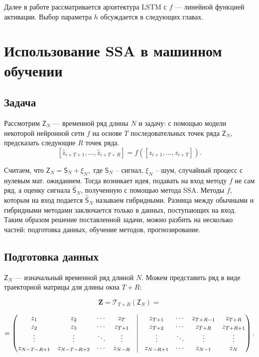\documentclass[specialist,
               substylefile = spbu.rtx,
               subf,href,colorlinks=true, 12p]{disser}
\begin{document}
Далее в работе рассматривается архитектура LSTM с $f$ --- линейной функцией активации. Выбор параметра $h$ обсуждается в следующих главах.

\chapter{Использование SSA в машинном обучении}
\label{chapterSSAML}
\section{Задача}
Рассмотрим $\mathsf{Z}_N$ --- временной ряд длины $N$ и задачу: с помощью модели некоторой нейронной сети $f$ на основе $T$ последовательных точек ряда $\mathsf{Z}_N$, предсказать следующие $R$ точек ряда.
$$ [\widehat{z}_{i+T+1}, \ldots , \widehat{z}_{i+T+R}] = f ([z_{i+1}, \ldots, z_{i+T}]). $$

Считаем, что $ \mathsf{Z}_N = \mathsf{S}_N + \xi_N, $ где $\mathsf{S}_N$ -- сигнал, $\xi_N$ -- шум, случайный процесс с нулевым мат. ожиданием. Тогда возникает идея, подавать на вход методу $f$ не сам ряд, а оценку сигнала $\widehat{\mathsf{S}}_N$, полученную с помощью метода SSA. Методы $f$, которым на вход подается $\widehat{\mathsf{S}}_N$ называем гибридными. Разница между обычными и гибридными методами заключается только в данных, поступающих на вход. Таким образом решение поставленной задачи, можно разбить на несколько частей: подготовка данных, обучение методов, прогнозирование.

\section{Подготовка данных}
$\mathsf{Z}_N$ --- изначальный временной ряд длиной $N$.
Можем представить ряд в виде траекторной матрицы для длины окна $T + R$:


$$ \mathbf{Z} = \mathcal{T}_{T+R}(\mathsf{Z}_N) = $$

\begin{equation*} 
	= \begin{pmatrix}
		z_1 & z_2 & \cdots & z_{T} & \vrule & z_{T+1} &  \cdots & z_{T+R-1} & z_{T+R} \\
		z_2 & z_3 & \cdots & z_{T+1} & \vrule & z_{T+2} &  \cdots & z_{T+R} & z_{T+R+1} \\
		\vdots & \vdots & \ddots & \vdots & \vrule & \vdots & \ddots & \vdots & \vdots  \\
		z_{N-T-R+1} & z_{N-T-R+2} & \cdots & z_{N-R} & \vrule & z_{N-R+1} &  \cdots & z_{N-1} & z_{N} \\
	\end{pmatrix}.
\end{equation*}
\end{document}
